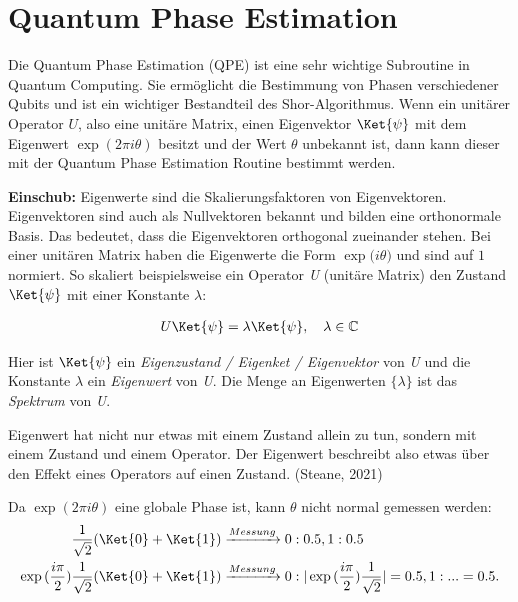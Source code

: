 \section{Quantum Phase Estimation}\newline

Die Quantum Phase Estimation (QPE) ist eine sehr wichtige Subroutine in Quantum Computing. Sie ermöglicht die Bestimmung von Phasen verschiedener Qubits und ist ein wichtiger Bestandteil des Shor-Algorithmus.
Wenn ein unitärer Operator \(U\), also eine unitäre Matrix, einen Eigenvektor \(\Ket{\psi}\) mit dem Eigenwert \(\exp{(2\pi i\theta)}\) besitzt und der Wert \(\theta\) unbekannt ist, dann kann dieser mit der Quantum Phase Estimation Routine bestimmt werden.\newline \newline

\hr
\textbf{Einschub:}
Eigenwerte sind die Skalierungsfaktoren von Eigenvektoren. Eigenvektoren sind auch als Nullvektoren bekannt und bilden eine orthonormale Basis. Das bedeutet, dass die Eigenvektoren orthogonal zueinander stehen. Bei einer unitären Matrix haben die Eigenwerte die Form \(\exp{(i\theta})\) und sind auf \(1\) normiert.
So skaliert beispielsweise ein Operator \textit{U} (unitäre Matrix) den Zustand \(\Ket{\psi}\) mit einer Konstante \(\lambda\):

\begin{gather*}
    U\Ket{\psi} = \lambda\Ket{\psi}, \quad \lambda \in \mathbb{C}
\end{gather*}

Hier ist \(\Ket{\psi}\) ein \textit{Eigenzustand / Eigenket / Eigenvektor} von \textit{U} und die Konstante \(\lambda\) ein \textit{Eigenwert} von \textit{U}. Die Menge an Eigenwerten \(\{\lambda\}\) ist das \textit{Spektrum} von \textit{U}. 

\glqqEin Eigenwert hat nicht nur etwas mit einem Zustand allein zu tun, sondern mit einem Zustand und einem Operator. Der Eigenwert beschreibt also etwas über den Effekt eines Operators auf einen Zustand. \grqq  (Steane, 2021)

\hr
\newline


Da \(\exp{(2\pi i\theta)}\) eine globale Phase ist, kann \(\theta\) nicht normal gemessen werden: \newline \newline
\begin{align*}
    \frac{1}{\sqrt{2}}(\Ket{0} + \Ket{1}) & \xrightarrow{Messung}
    {0: 0.5, 1: 0.5}                                              \\
    \exp{(\frac{i\pi}{2})}\frac{1}{\sqrt{2}}(\Ket{0} + \Ket{1})
                                          & \xrightarrow{Messung}
    {0: |\exp{(\frac{i\pi}{2})}\frac{1}{\sqrt{2}}|=0.5, 1: ...=0.5.}
\end{align*}\newline




